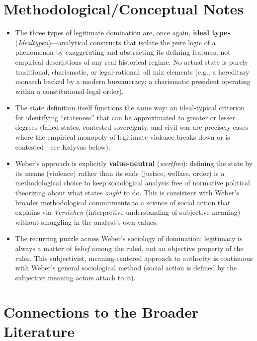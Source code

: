 \documentclass[12pt]{article}
\begin{document}
\section{Methodological/Conceptual Notes}

\begin{itemize}[leftmargin=*, itemsep=4pt]
    \item The three types of legitimate domination are, once again, \textbf{ideal types} (\textit{Idealtypen})---analytical constructs that isolate the pure logic of a phenomenon by exaggerating and abstracting its defining features, not empirical descriptions of any real historical regime. No actual state is purely traditional, charismatic, or legal-rational; all mix elements (e.g., a hereditary monarch backed by a modern bureaucracy; a charismatic president operating within a constitutional-legal order).
    \item The state definition itself functions the same way: an ideal-typical criterion for identifying ``stateness'' that can be approximated to greater or lesser degrees (failed states, contested sovereignty, and civil war are precisely cases where the empirical monopoly of legitimate violence breaks down or is contested---see Kalyvas below).
    \item Weber's approach is explicitly \textbf{value-neutral} (\textit{wertfrei}): defining the state by its means (violence) rather than its ends (justice, welfare, order) is a methodological choice to keep sociological analysis free of normative political theorizing about what states \emph{ought} to do. This is consistent with Weber's broader methodological commitments to a science of social action that explains via \textit{Verstehen} (interpretive understanding of subjective meaning) without smuggling in the analyst's own values.
    \item The recurring puzzle across Weber's sociology of domination: legitimacy is always a matter of \emph{belief} among the ruled, not an objective property of the ruler. This subjectivist, meaning-centered approach to authority is continuous with Weber's general sociological method (social action is defined by the subjective meaning actors attach to it).
\end{itemize}

\section{Connections to the Broader Literature}
\end{document}

